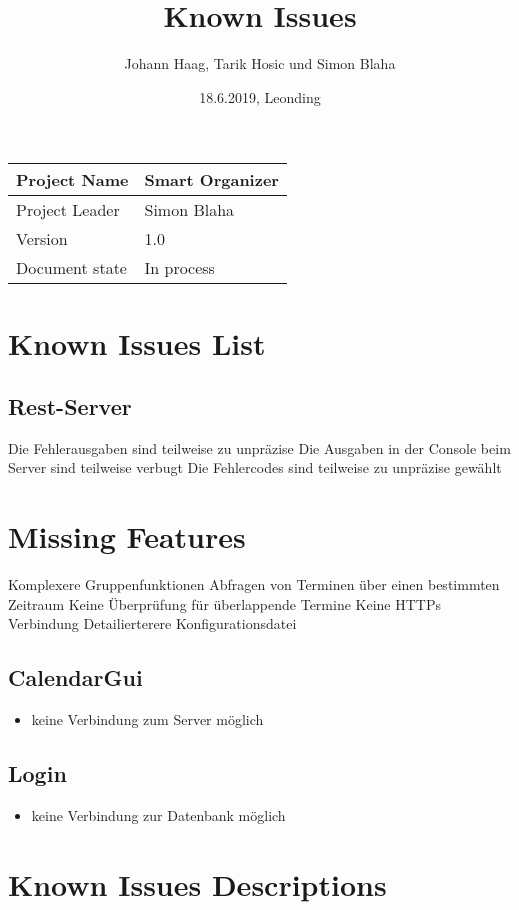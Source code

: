 \documentclass[12pt]{scrartcl}
\title{Known Issues}
\author{Johann Haag, Tarik Hosic und Simon Blaha}
\date{18.6.2019, Leonding}
\begin{document}
    \maketitle
    \begin{flushleft}
    \begin{tabular}{|l|l|}
    \hline
    Project Name & Smart Organizer \\ \hline
    Project Leader & Simon Blaha \\ \hline
    Version & 1.0\\ \hline
    Document state & In process \\ \hline
    \end{tabular}
    \end{flushleft}

    \pagebreak
    \tableofcontents
    \pagebreak

    \section{Known Issues List}
    \subsection{Rest-Server}
    \begin{itemize}
        Die Fehlerausgaben sind teilweise zu unpräzise 
        Die Ausgaben in der Console beim Server sind teilweise verbugt 
        Die Fehlercodes sind teilweise zu unpräzise gewählt
    \end{itemize}
    \section{Missing Features}
    \begin{itemize}
        Komplexere Gruppenfunktionen
        Abfragen von Terminen über einen bestimmten Zeitraum 
        Keine Überprüfung für überlappende Termine 
        Keine HTTPs Verbindung 
        Detailierterere Konfigurationsdatei
    \end{itemize}

    \subsection{CalendarGui}
    \begin{itemize}
        \item keine Verbindung zum Server möglich
    \end{itemize}

    \subsection{Login}
    \begin{itemize}
        \item keine Verbindung zur Datenbank möglich
    \end{itemize}

    \section{Known Issues Descriptions}


\end{document}
